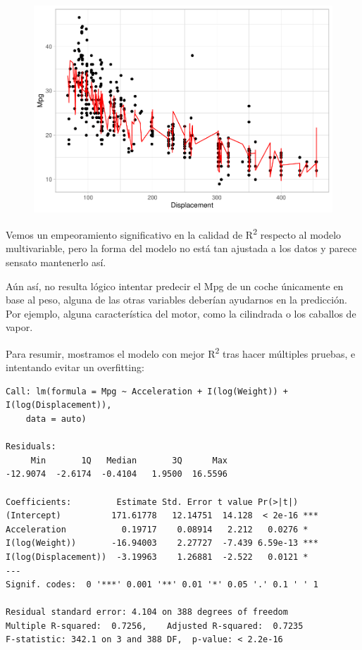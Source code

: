 \begin{figure}[H]\includegraphics[width=.88\linewidth]{img/Regresion_files/figure-latex/unnamed-chunk-24-3} \caption{}\end{figure}

Vemos un empeoramiento significativo en la calidad de R\textsuperscript{2} respecto al modelo multivariable, pero la forma del modelo no está tan ajustada a los datos y parece sensato mantenerlo así.

Aún así, no resulta lógico intentar predecir el Mpg de un coche únicamente en base al peso, alguna de las otras variables deberían ayudarnos en la predicción. Por ejemplo, alguna característica del motor, como la cilindrada o los caballos de vapor.

\vspace{\baselineskip}

Para resumir, mostramos el modelo con mejor R\textsuperscript{2} tras hacer múltiples pruebas, e intentando evitar un overfitting:
\begin{verbatim}
Call: lm(formula = Mpg ~ Acceleration + I(log(Weight)) + I(log(Displacement)), 
    data = auto)

Residuals:
     Min       1Q   Median       3Q      Max 
-12.9074  -2.6174  -0.4104   1.9500  16.5596 

Coefficients:         Estimate Std. Error t value Pr(>|t|)    
(Intercept)          171.61778   12.14751  14.128  < 2e-16 ***
Acceleration           0.19717    0.08914   2.212   0.0276 *  
I(log(Weight))       -16.94003    2.27727  -7.439 6.59e-13 ***
I(log(Displacement))  -3.19963    1.26881  -2.522   0.0121 *  
---
Signif. codes:  0 '***' 0.001 '**' 0.01 '*' 0.05 '.' 0.1 ' ' 1

Residual standard error: 4.104 on 388 degrees of freedom
Multiple R-squared:  0.7256,    Adjusted R-squared:  0.7235 
F-statistic: 342.1 on 3 and 388 DF,  p-value: < 2.2e-16
\end{verbatim}

